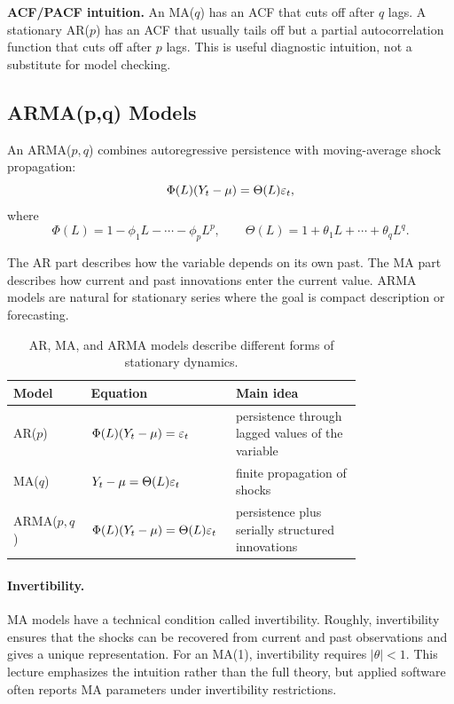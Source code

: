 \begin{boxD}
\textbf{ACF/PACF intuition.}
An MA($q$) has an ACF that cuts off after $q$ lags. A stationary AR($p$) has an ACF that usually tails off but a partial autocorrelation function that cuts off after $p$ lags. This is useful diagnostic intuition, not a substitute for model checking.
\end{boxD}

\subsection{ARMA(p,q) Models}
An ARMA($p,q$) combines autoregressive persistence with moving-average shock propagation:
\begin{equation}
\Phi(L)(Y_t-\mu)=\Theta(L)\varepsilon_t,
\label{eq:arma}
\end{equation}
where
\[
\Phi(L)=1-\phi_1L-\cdots-\phi_pL^p,
\qquad
\Theta(L)=1+\theta_1L+\cdots+\theta_qL^q.
\]

The AR part describes how the variable depends on its own past. The MA part describes how current and past innovations enter the current value. ARMA models are natural for stationary series where the goal is compact description or forecasting.

\begin{table}[h]
\centering
\small
\begin{tabular}{p{0.18\linewidth}p{0.26\linewidth}p{0.34\linewidth}}
\toprule
Model & Equation & Main idea \\
\midrule
AR($p$) & $\Phi(L)(Y_t-\mu)=\varepsilon_t$ & persistence through lagged values of the variable \\
MA($q$) & $Y_t-\mu=\Theta(L)\varepsilon_t$ & finite propagation of shocks \\
ARMA($p,q$) & $\Phi(L)(Y_t-\mu)=\Theta(L)\varepsilon_t$ & persistence plus serially structured innovations \\
\bottomrule
\end{tabular}
\caption{AR, MA, and ARMA models describe different forms of stationary dynamics.}
\label{tab:arma_compare}
\end{table}

\paragraph{Invertibility.}
MA models have a technical condition called invertibility. Roughly, invertibility ensures that the shocks can be recovered from current and past observations and gives a unique representation. For an MA(1), invertibility requires $|\theta|<1$. This lecture emphasizes the intuition rather than the full theory, but applied software often reports MA parameters under invertibility restrictions.

